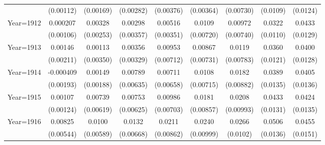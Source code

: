 \begin{table}[htbp]
\begin{tabular}{l*{8}{c}}
                    &   (0.00112)         &   (0.00169)         &   (0.00282)         &   (0.00376)         &   (0.00364)         &   (0.00730)         &    (0.0109)         &    (0.0124)         \\
[1em]
Year=1912           &    0.000207         &     0.00328         &     0.00298         &     0.00516         &      0.0109         &     0.00972         &      0.0322\sym{***}&      0.0433\sym{***}\\
                    &   (0.00106)         &   (0.00253)         &   (0.00357)         &   (0.00351)         &   (0.00720)         &   (0.00740)         &    (0.0110)         &    (0.0129)         \\
[1em]
Year=1913           &     0.00146         &     0.00113         &     0.00356         &     0.00953         &     0.00867         &      0.0119         &      0.0360\sym{***}&      0.0400\sym{***}\\
                    &   (0.00211)         &   (0.00350)         &   (0.00329)         &   (0.00712)         &   (0.00731)         &   (0.00783)         &    (0.0121)         &    (0.0128)         \\
[1em]
Year=1914           &   -0.000409         &     0.00149         &     0.00789         &     0.00711         &      0.0108         &      0.0182\sym{**} &      0.0389\sym{***}&      0.0405\sym{***}\\
                    &   (0.00193)         &   (0.00188)         &   (0.00635)         &   (0.00658)         &   (0.00715)         &   (0.00882)         &    (0.0135)         &    (0.0136)         \\
[1em]
Year=1915           &     0.00107         &     0.00739         &     0.00753         &     0.00986         &      0.0181\sym{**} &      0.0208\sym{**} &      0.0433\sym{***}&      0.0424\sym{***}\\
                    &   (0.00124)         &   (0.00619)         &   (0.00625)         &   (0.00703)         &   (0.00857)         &   (0.00993)         &    (0.0131)         &    (0.0135)         \\
[1em]
Year=1916           &     0.00825         &      0.0100\sym{*}  &      0.0132\sym{*}  &      0.0211\sym{**} &      0.0240\sym{**} &      0.0266\sym{***}&      0.0506\sym{***}&      0.0455\sym{***}\\
                    &   (0.00544)         &   (0.00589)         &   (0.00668)         &   (0.00862)         &   (0.00999)         &    (0.0102)         &    (0.0136)         &    (0.0151)         \\

\end{tabular}
\end{table}

